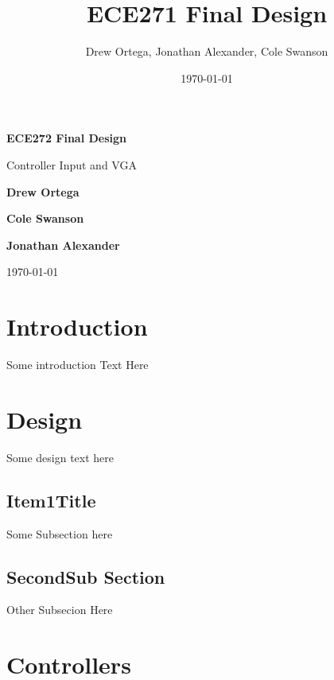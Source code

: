 \documentclass[]{article}
\title{ECE271 Final Design}
\author{Drew Ortega, Jonathan Alexander, Cole Swanson}
\date{\today}
\begin{document}
\begin{titlepage}
    \begin{center}
        \vspace*{1cm}
 
        \Huge
        \textbf{ECE272 Final Design}
 
        \vspace{0.5cm}
        \LARGE
        Controller Input and VGA
 
        \vspace{1.5cm}
 
        \textbf{Drew Ortega}
        
        \textbf{Cole Swanson}
        
        \textbf{Jonathan Alexander}
 
 		\vspace{0.5cm}
        \today
 
    \end{center}
\end{titlepage}

\newpage
	\tableofcontents
\newpage

\section{Introduction}
Some introduction Text Here

\section{Design}
Some design text here
\subsection{Item1Title}
Some Subsection here
\subsection{SecondSub Section}
Other Subsecion Here
\section{Controllers}
\end{document}
